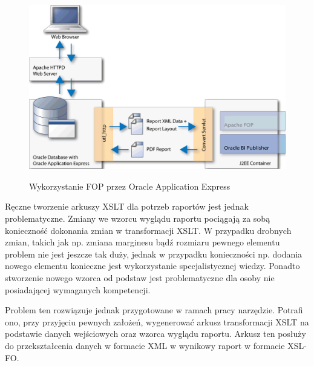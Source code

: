 \documentclass[11pt,a4paper]{article}
\begin{document}
\begin{figure}[h]
\centering
\caption{Wykorzystanie FOP przez Oracle Application Express}
\includegraphics[scale=0.5]{apex_fop_usage}
\label{img:apex_fop}
\end{figure}

Ręczne tworzenie arkuszy XSLT dla potrzeb raportów jest jednak problematyczne. Zmiany we wzorcu wyglądu raportu pociągają za sobą konieczność dokonania zmian w transformacji XSLT. W przypadku drobnych zmian, takich jak np. zmiana marginesu bądź rozmiaru pewnego elementu problem nie jest jeszcze tak duży, jednak w przypadku konieczności np. dodania nowego elementu konieczne jest wykorzystanie specjalistycznej wiedzy. Ponadto stworzenie nowego wzorca od podstaw jest problematyczne dla osoby nie posiadającej wymaganych kompetencji.

Problem ten rozwiązuje jednak przygotowane w ramach pracy narzędzie. Potrafi ono, przy przyjęciu pewnych założeń, wygenerować arkusz transformacji XSLT na podstawie danych wejściowych oraz wzorca wyglądu raportu. Arkusz ten posłuży do przekształcenia danych w formacie XML w wynikowy raport w formacie XSL-FO. 
\end{document}
